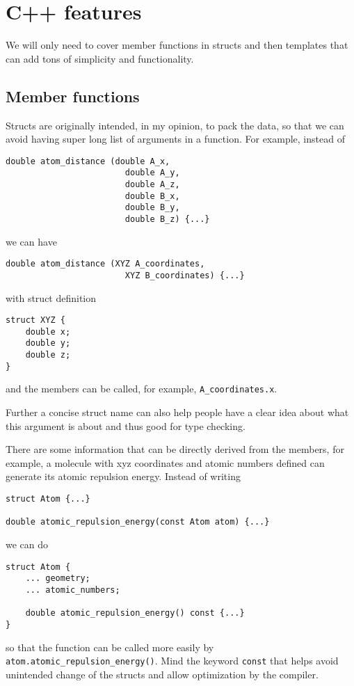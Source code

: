 \documentclass[12pt,a4paper,openany,twoside]{article}
\numberwithin{equation}{section}
\begin{document}
\section{C++ features}
We will only need to cover member functions in structs and then templates that can add tons of simplicity and functionality.

\subsection{Member functions}
Structs are originally intended, in my opinion, to pack the data, so that we can avoid having super long list of arguments in a function. For example, instead of
\begin{lstlisting}
double atom_distance (double A_x,
                        double A_y,
                        double A_z,
                        double B_x,
                        double B_y,
                        double B_z) {...}
\end{lstlisting}
we can have
\begin{lstlisting}
double atom_distance (XYZ A_coordinates,
                        XYZ B_coordinates) {...}
\end{lstlisting}
with struct definition 
\begin{lstlisting}
struct XYZ {
    double x;
    double y;
    double z;
}
\end{lstlisting}
and the members can be called, for example, \lstinline{A_coordinates.x}.

Further a concise struct name can also help people have a clear idea about what this argument is about and thus good for type checking.

There are some information that can be directly derived from the members, for example, a molecule with xyz coordinates and atomic numbers defined can generate its atomic repulsion energy. Instead of writing
\begin{lstlisting}
struct Atom {...}

double atomic_repulsion_energy(const Atom atom) {...}
\end{lstlisting} 
we can do 
\begin{lstlisting}
struct Atom {
    ... geometry;
    ... atomic_numbers;
    
    double atomic_repulsion_energy() const {...}
}
\end{lstlisting} 
so that the function can be called more easily by \lstinline{atom.atomic_repulsion_energy()}. Mind the keyword \lstinline{const} that helps avoid unintended change of the structs and allow optimization by the compiler.
\end{document}
